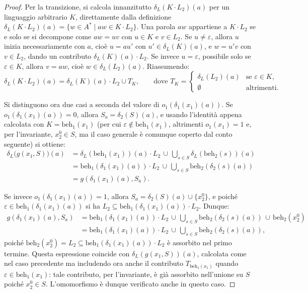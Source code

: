 \begin{proof}
  Per la transizione, si calcola innanzitutto \(\delta_L(K \cdot L_2)(a)\) per un linguaggio arbitrario \(K\), direttamente dalla definizione \(\delta_L(K \cdot L_2)(a) = \{w \in A^* \mid aw \in K \cdot L_2\}\). Una parola \(aw\) appartiene a \(K \cdot L_2\) se e solo se si decompone come \(aw = uv\) con \(u \in K\) e \(v \in L_2\). Se \(u \neq \varepsilon\), allora \(u\) inizia necessariamente con \(a\), cioè \(u = a u'\) con \(u' \in \delta_L(K)(a)\), e \(w = u'v\) con \(v \in L_2\), dando un contributo \(\delta_L(K)(a) \cdot L_2\). Se invece \(u = \varepsilon\), possibile solo se \(\varepsilon \in K\), allora \(v = aw\), cioè \(w \in \delta_L(L_2)(a)\). Riassumendo:
  \[
    \delta_L(K \cdot L_2)(a) = \delta_L(K)(a) \cdot L_2 \cup T_K, \qquad \text{dove } T_K =
    \begin{cases}
      \delta_L(L_2)(a) & \text{se } \varepsilon \in K, \\
      \emptyset        & \text{altrimenti.}
    \end{cases}
  \]

  Si distinguono ora due casi a seconda del valore di \(o_1(\delta_1(x_1)(a))\). Se \(o_1(\delta_1(x_1)(a)) = 0\), allora \(S_a = \delta_2(S)(a)\), e usando l'identità appena calcolata con \(K = \mathrm{beh}_1(x_1)\) (per cui \(\varepsilon \notin \mathrm{beh}_1(x_1)\), altrimenti \(o_1(x_1) = 1\) e, per l'invariante, \(x_2^0 \in S\), ma il caso generale è comunque coperto dal conto seguente) si ottiene:
  \[
    \begin{aligned}
      \delta_L\bigl(g(x_1, S)\bigr)(a) & = \delta_L(\mathrm{beh}_1(x_1))(a) \cdot L_2 \,\cup\, \bigcup_{s \in S} \delta_L(\mathrm{beh}_2(s))(a) \\
                                       & = \mathrm{beh}_1(\delta_1(x_1)(a)) \cdot L_2 \,\cup\, \bigcup_{s \in S} \mathrm{beh}_2(\delta_2(s)(a)) \\
                                       & = g(\delta_1(x_1)(a), S_a).
    \end{aligned}
  \]

  Se invece \(o_1(\delta_1(x_1)(a)) = 1\), allora \(S_a = \delta_2(S)(a) \cup \{x_2^0\}\), e poiché \(\varepsilon \in \mathrm{beh}_1(\delta_1(x_1)(a))\) si ha \(L_2 \subseteq \mathrm{beh}_1(\delta_1(x_1)(a)) \cdot L_2\). Dunque:
  \[
    \begin{aligned}
      g(\delta_1(x_1)(a), S_a) & = \mathrm{beh}_1(\delta_1(x_1)(a)) \cdot L_2 \,\cup\, \bigcup_{s \in S} \mathrm{beh}_2(\delta_2(s)(a)) \,\cup\, \mathrm{beh}_2(x_2^0) \\
                               & = \mathrm{beh}_1(\delta_1(x_1)(a)) \cdot L_2 \,\cup\, \bigcup_{s \in S} \mathrm{beh}_2(\delta_2(s)(a)),
    \end{aligned}
  \]
  poiché \(\mathrm{beh}_2(x_2^0) = L_2 \subseteq \mathrm{beh}_1(\delta_1(x_1)(a)) \cdot L_2\) è assorbito nel primo termine. Questa espressione coincide con \(\delta_L(g(x_1,S))(a)\), calcolata come nel caso precedente ma includendo ora anche il contributo \(T_{\mathrm{beh}_1(x_1)}\) quando \(\varepsilon \in \mathrm{beh}_1(x_1)\): tale contributo, per l'invariante, è già assorbito nell'unione su \(S\) poiché \(x_2^0 \in S\). L'omomorfismo è dunque verificato anche in questo caso.


\end{proof}
